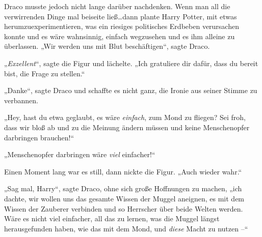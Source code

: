 Draco musste jedoch nicht lange darüber nachdenken. Wenn man all die verwirrenden Dinge mal beiseite ließ…dann plante Harry Potter, mit etwas herumzuexperimentieren, was ein riesiges politisches Erdbeben verursachen konnte und es wäre wahnsinnig, einfach wegzusehen und es ihm alleine zu überlassen. „Wir werden uns mit Blut beschäftigen“, sagte Draco.

„\emph{Exzellent}“, sagte die Figur und lächelte. „Ich gratuliere dir dafür, dass du bereit bist, die Frage zu stellen.“

„Danke“, sagte Draco und schaffte es nicht ganz, die Ironie aus seiner Stimme zu verbannen.

„Hey, hast du etwa geglaubt, es wäre \emph{einfach}, zum Mond zu fliegen? Sei froh, dass wir bloß ab und zu die Meinung ändern müssen und keine Menschenopfer darbringen brauchen!“

„Menschenopfer darbringen wäre \emph{viel} einfacher!“

Einen Moment lang war es still, dann nickte die Figur. „Auch wieder wahr.“

„Sag mal, Harry“, sagte Draco, ohne sich große Hoffnungen zu machen, „ich dachte, wir wollen uns das gesamte Wissen der Muggel aneignen, es mit dem Wissen der Zauberer verbinden und so Herrscher über beide Welten werden. Wäre es nicht viel einfacher, all das zu lernen, was die Muggel längst herausgefunden haben, wie das mit dem Mond, und \emph{diese} Macht zu nutzen –“

